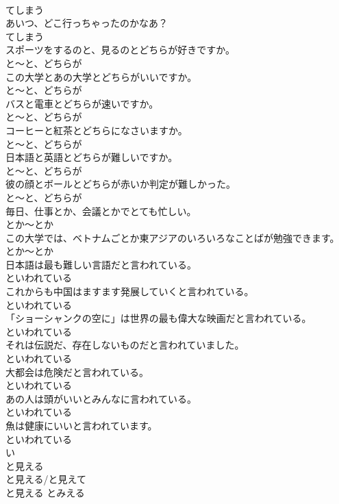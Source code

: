 \documentclass[8pt]{extreport}
\begin{document}
\begin{CJK}{UTF8}{min}
\\	てしまう
\\	あいつ、どこ行っちゃったのかなあ？	
\\	てしまう
\\	スポーツをするのと、見るのとどちらが好きですか。	
\\	と～と、どちらが
\\	この大学とあの大学とどちらがいいですか。	
\\	と～と、どちらが
\\	バスと電車とどちらが速いですか。	
\\	と～と、どちらが
\\	コーヒーと紅茶とどちらになさいますか。	
\\	と～と、どちらが
\\	日本語と英語とどちらが難しいですか。	
\\	と～と、どちらが
\\	彼の顔とボールとどちらが赤いか判定が難しかった。	
\\	と～と、どちらが
\\	毎日、仕事とか、会議とかでとても忙しい。	
\\	とか～とか
\\	この大学では、ベトナムごとか東アジアのいろいろなことばが勉強できます。	
\\	とか～とか
\\	日本語は最も難しい言語だと言われている。	
\\	といわれている
\\	これからも中国はますます発展していくと言われている。	
\\	といわれている
\\	「ショーシャンクの空に」は世界の最も偉大な映画だと言われている。	
\\	といわれている
\\	それは伝説だ、存在しないものだと言われていました。	
\\	といわれている
\\	大都会は危険だと言われている。	
\\	といわれている
\\	あの人は頭がいいとみんなに言われている。	
\\	といわれている
\\	魚は健康にいいと言われています。	
\\	といわれている
\\	い
\\	と見える	
\\	と見える/と見えて	
\\	と見える	とみえる

\end{CJK}
\end{document}
